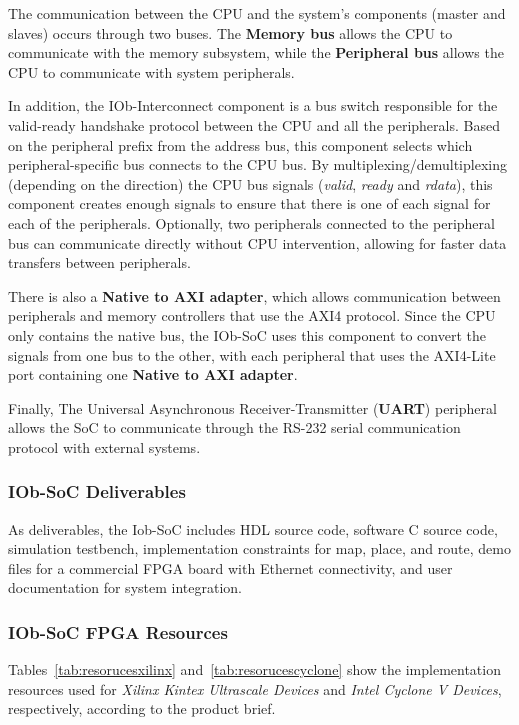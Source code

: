 The communication between the CPU and the system’s components (master and slaves) occurs through two buses. The \textbf{Memory bus} allows the CPU to communicate with the memory subsystem, while the \textbf{Peripheral bus} allows the CPU to communicate with system peripherals.

In addition, the IOb-Interconnect component is a bus switch responsible for the valid-ready handshake protocol between the CPU and all the peripherals. 
Based on the peripheral prefix from the address bus, this component selects which peripheral-specific bus connects to the CPU bus. By multiplexing/demultiplexing (depending on the direction) the CPU bus signals (\textit{valid}, \textit{ready} and \textit{rdata}), this component creates enough signals to ensure that there is one of each signal for each of the peripherals. Optionally, two peripherals connected to the peripheral bus can communicate directly without CPU intervention, allowing for faster data transfers between peripherals.

There is also a \textbf{Native to AXI adapter}, which allows communication between peripherals and memory controllers that use the AXI4 protocol. Since the CPU only contains the native bus, the IOb-SoC uses this component to convert the signals from one bus to the other, with each peripheral that uses the AXI4-Lite port containing one \textbf{Native to AXI adapter}.

Finally, The Universal Asynchronous Receiver-Transmitter (\textbf{\textbf{UART}}) peripheral allows the SoC to communicate through the RS-232 serial communication protocol with external systems. 

\subsubsection{IOb-SoC Deliverables}
As deliverables, the Iob-SoC includes HDL source code, software C source code, simulation testbench, implementation constraints for map, place, and route, demo files for a commercial FPGA board with Ethernet connectivity, and user documentation for system integration.

\subsubsection{IOb-SoC FPGA Resources}
Tables~\ref{tab:resorucesxilinx} and~\ref{tab:resorucescyclone} show the implementation resources used for \textit{Xilinx Kintex Ultrascale Devices} and \textit{Intel Cyclone V Devices}, respectively, according to the product brief.

